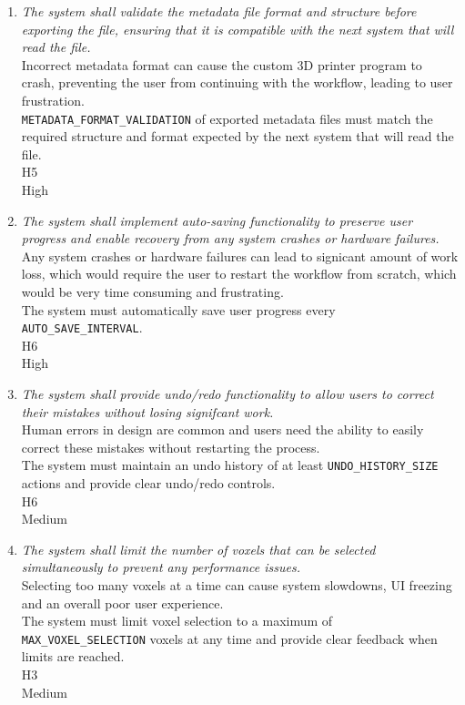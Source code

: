 \documentclass{article}
\begin{document}
\begin{enumerate}
\item \emph{The system shall validate the metadata file format and structure before exporting the file, ensuring that it is compatible with the next system that will read the file.}\\
     Incorrect metadata format can cause the custom 3D printer program to crash, preventing the user from continuing with the workflow, leading to user frustration.\\
     \texttt{METADATA\_FORMAT\_VALIDATION} of exported metadata files must match the required structure and format expected by the next system that will read the file.\\
     H5\\
     High

\item \emph{The system shall implement auto-saving functionality to preserve user progress and enable recovery from any system crashes or hardware failures.}\\
     Any system crashes or hardware failures can lead to signicant amount of work loss, which would require the user to restart the workflow from scratch, which would be very time consuming and frustrating.\\
     The system must automatically save user progress every \texttt{AUTO\_SAVE\_INTERVAL}.\\
     H6\\
     High

\item \emph{The system shall provide undo/redo functionality to allow users to correct their mistakes without losing signifcant work.}\\
     Human errors in design are common and users need the ability to easily correct these mistakes without restarting the process.\\
     The system must maintain an undo history of at least \texttt{UNDO\_HISTORY\_SIZE} actions and provide clear undo/redo controls.\\
     H6\\
     Medium

\item \emph{The system shall limit the number of voxels that can be selected simultaneously to prevent any performance issues.}\\
     Selecting too many voxels at a time can cause system slowdowns, UI freezing and an overall poor user experience.\\
     The system must limit voxel selection to a maximum of \texttt{MAX\_VOXEL\_SELECTION} voxels at any time and provide clear feedback when limits are reached.\\
     H3\\
     Medium


\end{enumerate}
\end{document}

